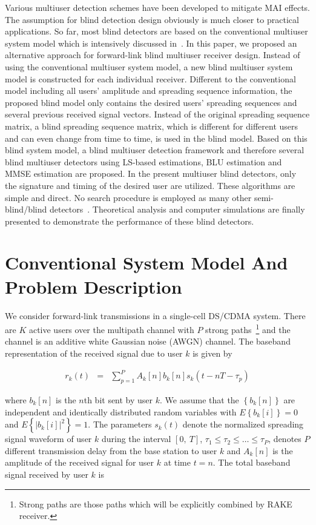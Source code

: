 \documentclass[a4paper,10pt,fleqn, twocolumn]{IEEETran}
\begin{document}
Various multiuser detection schemes have been developed to
mitigate MAI effects. The assumption for blind detection design
obviously is much closer to practical applications. So far, most
blind detectors are based on the conventional multiuser system
model which is intensively discussed in~\cite{Verd98}. In this
paper, we proposed an alternative approach for forward-link blind
multiuser receiver design. Instead of using the conventional
multiuser system model, a new blind multiuser system model is
constructed for each individual receiver. Different to the
conventional model including all users' amplitude and spreading
sequence information, the proposed blind model only contains the
desired users' spreading sequences and several previous received
signal vectors. Instead of the original spreading sequence matrix,
a blind spreading sequence matrix, which is different for
different users and can even change from time to time, is used in
the blind model. Based on this blind system model, a blind
multiuser detection framework and therefore several blind
multiuser detectors using LS-based estimations, BLU estimation and
MMSE estimation are proposed. In the present multiuser blind
detectors, only the signature and timing of the desired user are
utilized. These algorithms are simple and direct. No search
procedure is employed as many other semi-blind/blind
detectors~\cite{Torl97,Wang98}. Theoretical analysis and computer
simulations are finally presented to demonstrate the performance
of these blind detectors.

\section{Conventional System Model And Problem Description}

We consider forward-link transmissions in a single-cell DS/CDMA
system. There are $K$ active users over the multipath channel with
$P$ strong paths~\footnote{Strong paths are those paths which will
be explicitly combined by RAKE receiver.} and the channel is an
additive white Gaussian noise (AWGN) channel. The baseband
representation of the received signal due to user $k$ is given by

\begin{equation}
\begin{array}{rcl}
r_k(t)&=&\sum\limits_{p=1}^{P}A_k[n] b_k[n]s_k(t-nT-\tau_p)
\end{array}
\end{equation}


\noindent where $b_k{[n]}$ is the $n$th bit sent by user $k$. We
assume that the $\left\{b_k{[n]}\right\}$ are independent and
identically distributed random variables with
$E\left\{b_k{[i]}\right\}=0$ and $E\left\{|b_k{[i]}|^2\right\}=1$.
The parameters $s_k(t)$ denote the normalized spreading signal
waveform of user $k$ during the interval $[0,\ T]$,
$\tau_1\leq\tau_2\leq\ldots\leq\tau_P$, denotes $P$ different
transmission delay from the base station to user $k$ and $A_k[n]$
is the amplitude of the received signal for user $k$ at time
$t=n$. The total baseband signal received by user $k$ is
\end{document}
